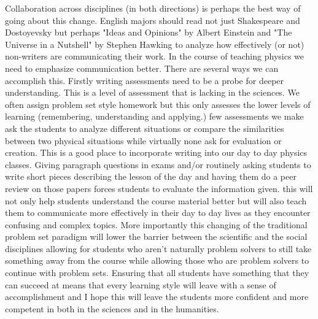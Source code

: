 \documentclass{article}
\begin{document}
Collaboration across disciplines (in both directions) is perhaps the best way of going about this change. English majors should read not just Shakespeare and Dostoyevsky but perhaps "Ideas and Opinions" by Albert Einstein and "The Universe in a Nutshell" by Stephen Hawking to analyze how effectively (or not) non-writers are communicating their work. In the course of teaching physics we need to emphasize communication better. There are several ways we can accomplish this. Firstly writing assessments need to be a probe for deeper understanding. This is a level of assessment that is lacking in the sciences. We often assign problem set style homework but this only assesses the lower levels of learning (remembering, understanding and applying.) few assessments we make ask the students to analyze different situations or compare the similarities between two physical situations while virtually none ask for evaluation or creation. This is a good place to incorporate writing into our day to day physics classes. Giving paragraph questions in exams and/or routinely asking students to write short pieces describing the lesson of the day and having them do a peer review on those papers forces students to evaluate the information given. this will not only help students understand the course material better but will also teach them to communicate more effectively in their day to day lives as they encounter confusing and complex topics. More importantly this changing of the traditional problem set paradigm will lower the barrier between the scientific and the social disciplines allowing for students who aren't naturally problem solvers to still take something away from the course while allowing those who are problem solvers to continue with problem sets. Ensuring that all students have something that they can succeed at means that every learning style will leave with a sense of accomplishment and I hope this will leave the students more confident and more competent in both in the sciences and in the humanities.
\end{document}
